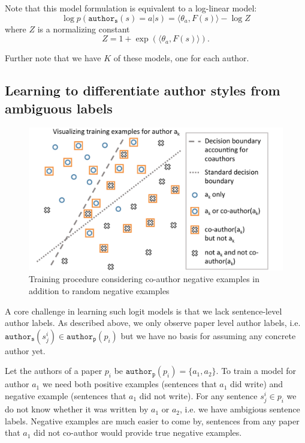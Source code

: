 Note that this model formulation is equivalent to a log-linear model:
$$\log p(\mathtt{author_s}(s)=a | s) = \langle\theta_a, F(s)\rangle - \log Z$$
where $Z$ is a normalizing constant 
$$Z= 1 + \exp(\langle\theta_a, F(s)\rangle).$$

Further note that we have $K$ of these models, one for each author.


\subsection{Learning to differentiate author styles from ambiguous labels}
\label{subsec:fancy_training}

\begin{figure}[htbp]
\begin{center}
\includegraphics[width=\linewidth]{fancy_training.pdf}
\caption{Training procedure considering co-author negative examples in addition to random negative examples}
\label{fig:fancy_training}
\end{center}
\end{figure}


A core challenge in learning such logit models is that we lack sentence-level author labels.
As described above, we only observe paper level author labels, i.e. $\mathtt{author_s}(s_j^i) \in \mathtt{author_p}(p_i)$ but we have no basis for assuming any concrete author yet.

Let the authors of a paper $p_i$ be $\mathtt{author_p}(p_i) = \{ a_1, a_2\}$.
To train a model for author $a_1$ we need both positive examples (sentences that $a_1$ did write) and negative example (sentences that $a_1$ did not write). 
For any sentence $s_j^i \in p_i$ we do not know whether it was written by $a_1$ or $a_2$, i.e. we have ambigious sentence labels.
Negative examples are much easier to come by, sentences from any paper that $a_1$ did not co-author would provide true negative examples.

